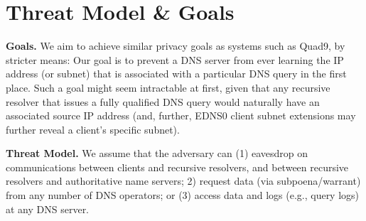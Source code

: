 \section{Threat Model \& Goals}
\label{sec:threat}

{\bf Goals.} We aim to achieve similar privacy goals as systems such as Quad9, by stricter 
means: Our goal is to prevent a DNS server from ever learning the IP address 
(or subnet) that is associated with a particular DNS query in the first place. 
Such a goal might seem intractable at first, given that any recursive resolver 
that issues a fully qualified DNS query would naturally have an associated source 
IP address (and, further, EDNS0 client subnet extensions may further reveal a 
client’s specific subnet).  


{\bf Threat Model.} We assume that the adversary can (1) eavesdrop 
on communications between clients and recursive resolvers, and between recursive 
resolvers and authoritative name servers; 2) request data (via subpoena/warrant) 
from any number of DNS operators; or (3) access data and logs (e.g., query logs) 
at any DNS server.  
